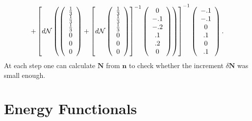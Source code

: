 \documentclass[aps,preprint]{revtex4}%
\begin{document}
\begin{equation}
+\left[  d\mathcal{N}\left(  \left(
\begin{array}
[c]{c}%
\frac{1}{3}\\
\frac{1}{3}\\
\frac{1}{3}\\
0\\
0\\
0
\end{array}
\right)  +\left[  d\mathcal{N}\left(
\begin{array}
[c]{c}%
\frac{1}{3}\\
\frac{1}{3}\\
\frac{1}{3}\\
0\\
0\\
0
\end{array}
\right)  \right]  ^{-1}\left(
\begin{array}
[c]{c}%
0\\
-.1\\
-.2\\
.1\\
.2\\
0
\end{array}
\right)  \right)  \right]  ^{-1}\left(
\begin{array}
[c]{c}%
-.1\\
-.1\\
0\\
.1\\
0\\
.1
\end{array}
\right)  .
\end{equation}
At each step one can calculate $\mathbf{N}$ from $\mathbf{n}$ to check whether
the increment $\delta\mathbf{N}$ was small enough.

\section{Energy Functionals\label{En_Funcs}}
\end{document}

